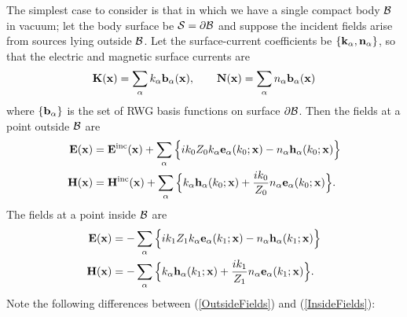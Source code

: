 The simplest case to consider is that in which we have
a single compact body $\mathcal{B}$ in vacuum; let the body surface
be $\mathcal{S}=\partial \mathcal{B}$ and suppose the incident fields 
arise from sources lying outside $\mathcal{B}$. Let the surface-current
coefficients be $\{\mathbf{k}_\alpha, \mathbf{n}_\alpha\}$, so that 
the electric and magnetic surface currents are
$$ \mathbf{K}(\mathbf{x}) = \sum_{\alpha} k_\alpha \mathbf{b}_\alpha(\mathbf{x}),
   \qquad
   \mathbf{N}(\mathbf{x}) = \sum_{\alpha} n_\alpha \mathbf{b}_\alpha(\mathbf{x})
$$
where $\{\mathbf{b}_\alpha\}$ is the set of RWG basis functions 
on surface $\partial \mathcal{B}$. Then the fields at a point outside 
$\mathcal{B}$ are
\begin{subequations}
\begin{align}
 \mathbf{E}(\mathbf{x}) 
  &= \mathbf{E}^{\hbox{\scriptsize{inc}}}(\mathbf{x}) + 
\sum_{\alpha} \Big\{ ik_0Z_0 k_\alpha \mathbf{e}_\alpha(k_0; \mathbf{x})
                             -n_\alpha \mathbf{h}_\alpha(k_0; \mathbf{x})
                   \Big\}
\\
 \mathbf{H}(\mathbf{x}) 
  &= \mathbf{H}^{\hbox{\scriptsize{inc}}}(\mathbf{x}) + 
     \sum_{\alpha} \Big\{     k_\alpha \mathbf{h}_\alpha(k_0; \mathbf{x})
                         +\frac{ik_0}{Z_0} n_\alpha \mathbf{e}_\alpha(k_0; \mathbf{x})
                   \Big\}.
\end{align}
\label{OutsideFields}
\end{subequations}
The fields at a point inside $\mathcal{B}$ are 
\begin{subequations}
\begin{align}
 \mathbf{E}(\mathbf{x})
  &= -\sum_{\alpha} \Big\{ ik_1Z_1 k_\alpha \mathbf{e}_\alpha(k_1; \mathbf{x})
                                  -n_\alpha \mathbf{h}_\alpha(k_1; \mathbf{x})
                   \Big\}
\\
 \mathbf{H}(\mathbf{x}) 
  &= -\sum_{\alpha} \Big\{     k_\alpha \mathbf{h}_\alpha(k_1; \mathbf{x})
                         +\frac{ik_1}{Z_1} n_\alpha \mathbf{e}_\alpha(k_1; \mathbf{x})
                   \Big\}.
\end{align}
\label{InsideFields}
\end{subequations}
Note the following differences between (\ref{OutsideFields}) and
(\ref{InsideFields}):
